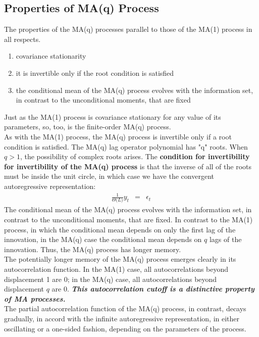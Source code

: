 \subsection{Properties of MA(q) Process}

The properties of the MA(q) processes parallel to those of the MA(1) process in all respects.
\begin{enumerate}
	\item covariance stationarity
	\item it is invertible only if the root condition is satisfied
	\item the conditional mean of the MA(q) process evolves with the information set, in contrast to the unconditional moments, that are fixed
\end{enumerate}
Just as the MA(1) process is covariance stationary for any value of its parameters, so, too, is the finite-order MA(q) process.\\
As with the MA(1) process, the MA(q) process is invertible only if a root condition is satisfied. The MA(q) lag operator polynomial has "q" roots. When $q > 1$, the possibility of complex roots arises. The \textbf{\color{blue}condition for invertibility for invertibility of the MA(q) process} is that the inverse of all of the roots must be inside the unit circle, in which case we have the convergent autoregressive representation:
\begin{eqnarray}
\frac{1}{\Theta\big(L\big)}y_{t} &=& \epsilon_{t}
\end{eqnarray}
The conditional mean of the MA(q) process evolves with the information set, in contrast to the unconditional moments, that are fixed. In contrast to the MA(1) process, in which the conditional mean depends on only the first lag of the innovation, in the MA(q) case the conditional mean depends on $q$ lags of the innovation. Thus, the MA(q) process has longer memory.\\
The potentially longer memory of the MA(q) process emerges clearly in its autocorrelation function. In the MA(1) case, all autocorrelations beyond displacement 1 are 0; in the MA(q) case, all autocorrelations beyond displacement $q$ are 0. \textit{\textbf{\color{blue}This autocorrelation cutoff is a distinctive property of MA processes.}}\\
The partial autocorrelation function of the MA(q) process, in contrast, decays gradually, in accord with the infinite autoregressive representation, in either oscillating or a one-sided fashion, depending on the parameters of the process.





